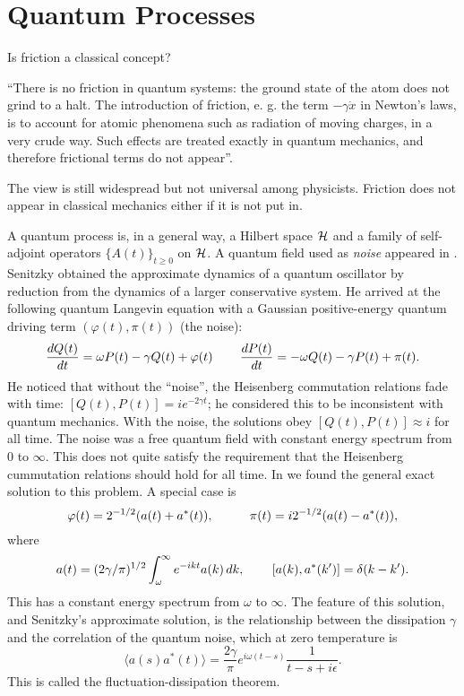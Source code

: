 \section{Quantum Processes}
Is friction a classical concept? 

``There is no
friction in quantum systems: the ground state of the atom does not grind
to a halt. The introduction of friction, e. g. the term
$-\gamma\dot{x}$ in Newton's laws, is to account for atomic phenomena
such as radiation of moving charges, in a very crude way. Such effects
are treated exactly in quantum mechanics, and therefore frictional terms
do not appear''. 

The view is still widespread but not universal among
physicists. Friction does not appear in classical mechanics either if
it is not put in.

A quantum process is, in a general way, a Hilbert space ${\cal H}$
and a family of self-adjoint operators $\{A(t)\}_{t\geq 0}$ on ${\cal H}$.
A quantum field used as {\em noise} appeared in
\cite{Senitzky}. Senitzky obtained
the approximate dynamics of a quantum oscillator by reduction
from the dynamics of a larger conservative system. He arrived at the
following quantum Langevin equation with a Gaussian positive-energy
quantum driving term $(\varphi(t),\pi(t))$ (the noise):
\begin{equation}
\frac{dQ(t)}{dt}=\omega P(t)-\gamma Q(t)+\varphi(t)\hspace{.3in}
\frac{dP(t)}{dt}=-\omega Q(t)-\gamma P(t)+\pi(t).
\end{equation}
He noticed that without the ``noise'', the Heisenberg commutation
relations fade with time: $[Q(t),P(t)]=ie^{-2\gamma t}$; he considered
this to be inconsistent with quantum mechanics. With the noise, the
solutions obey $[Q(t),P(t)]\approx i$ for all time. The noise
was a free quantum field with constant energy spectrum from $0$ to
$\infty$. This does not quite satisfy the requirement that the Heisenberg
cummutation relations should hold for all time. In \cite{RFS5}
we found the general exact solution to this problem.  A special case is
\[\varphi(t)=2^{-1/2}(a(t)+a^*(t)),\hspace{.4in}\pi(t)=i2^{-1/2}
(a(t)-a^*(t)),\]
where
\[a(t)=(2\gamma/\pi)^{1/2}\int_\omega^\infty e^{-ikt}a(k)\,dk,
\hspace{.3in}[a(k),a^*(k^\prime)]=\delta(k-k^\prime).\]
This has a constant energy spectrum from $\omega$ to $\infty$.
The feature of this solution, and Senitzky's approximate solution,
is the relationship between the dissipation $\gamma$ and the correlation
of the quantum noise, which at zero temperature is 
\[ \langle a(s)a^*(t)\rangle=\frac{2\gamma}{\pi}e^{i\omega(t-s)}\frac{1}{
t-s+i\epsilon}.\]
This is called the fluctuation-dissipation theorem.


